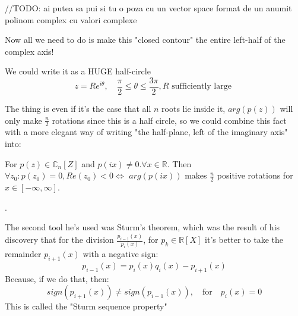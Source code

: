//TODO: ai putea sa pui si tu o poza cu un vector space format de un anumit polinom complex cu valori complexe

Now all we need to do is make this "closed contour" the entire left-half of the complex axis!

We could write it as a {\large HUGE} half-circle
\[
  z = Re^{i \theta}, \quad \frac{\pi}{2} \leq \theta \leq \frac{3 \pi}{2}, R \text{ sufficiently large }
\]

The thing is even if it's the case that all $n$ roots lie inside it, $arg(p(z))$ will only make $\frac{n}{2}$ rotations since this is a half circle, so we could combine this fact with a more elegant way of writing "the half-plane, left of the imaginary axis" into:

\begin{lemma}
  For $p(z) \in \mathbb{C}_n[Z]$ and $p(ix) \neq 0. \forall x \in \mathbb{R}$. Then $\forall z_0 : p(z_0) = 0, Re(z_0) < 0 \iff$ $arg(p(ix))$ makes $\frac{n}{2}$ positive rotations for $x \in [-\infty , \infty]$.
\end{lemma}

.

The second tool he's used was Sturm's theorem, which was the result of his discovery that for the division $\frac{p_{i-1}(x)}{p_i(x)}$, for $p_k \in \mathbb{R}[X]$ it's better to take the remainder $p_{i+1}(x)$ with a negative sign:
\begin{equation}\label{sturms_theorem}
  p_{i-1}(x) = p_i(x) q_i(x) - p_{i+1}(x)
\end{equation}
Because, if we do that, then:
\begin{equation}\label{sturm_seq_property}
  sign ( p_{i+1}(x) )  \neq sign ( p_{i-1}(x) ), \quad \text{for} \quad p_i(x)=0 \tag{Sturm. Seq. Property}
\end{equation}
This is called the "Sturm sequence property"

